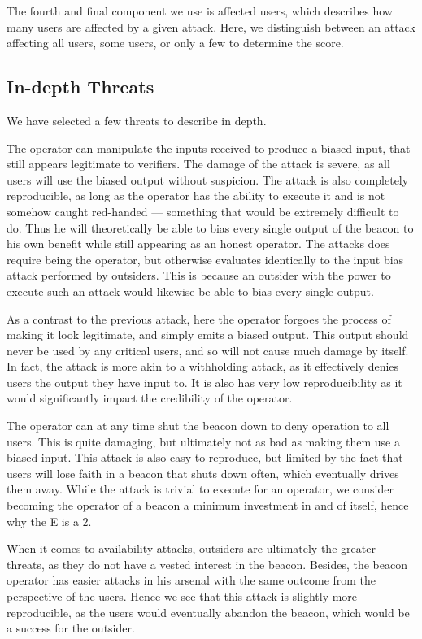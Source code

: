 The fourth and final component we use is affected users, which describes how many users are affected by a given attack. Here, we distinguish between an attack affecting all users, some users, or only a few to determine the score.

\subsection{In-depth Threats}
We have selected a few threats to describe in depth. 

The operator can manipulate the inputs received to produce a biased input, that still appears legitimate to verifiers. The damage of the attack is severe, as all users will use the biased output without suspicion. The attack is also completely reproducible, as long as the operator has the ability to execute it and is not somehow caught red-handed --- something that would be extremely difficult to do. Thus he will theoretically be able to bias every single output of the beacon to his own benefit while still appearing as an honest operator. The attacks does require being the operator, but otherwise evaluates identically to the input bias attack performed by outsiders. This is because an outsider with the power to execute such an attack would likewise be able to bias every single output.

As a contrast to the previous attack, here the operator forgoes the process of making it look legitimate, and simply emits a biased output. This output should never be used by any critical users, and so will not cause much damage by itself. In fact, the attack is more akin to a withholding attack, as it effectively denies users the output they have input to. It is also has very low reproducibility as it would significantly impact the credibility of the operator.

The operator can at any time shut the beacon down to deny operation to all users. This is quite damaging, but ultimately not as bad as making them use a biased input. This attack is also easy to reproduce, but limited by the fact that users will lose faith in a beacon that shuts down often, which eventually drives them away. While the attack is trivial to execute for an operator, we consider becoming the operator of a beacon a minimum investment in and of itself, hence why the E is a 2.

When it comes to availability attacks, outsiders are ultimately the greater threats, as they do not have a vested interest in the beacon. Besides, the beacon operator has easier attacks in his arsenal with the same outcome from the perspective of the users. Hence we see that this attack is slightly more reproducible, as the users would eventually abandon the beacon, which would be a success for the outsider.